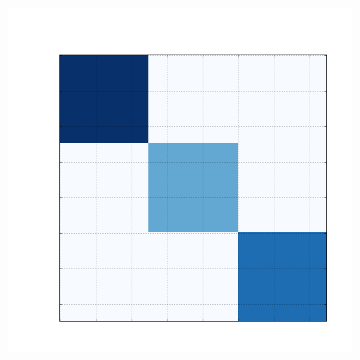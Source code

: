 \documentclass[10pt]{beamer}
\begin{document}
\begin{frame}
\begin{figure}[H]
\begin{subfigure}[b]{0.13\textwidth}
      \end{subfigure}
      \begin{subfigure}[b]{0.13\textwidth}
          \includegraphics[width=\textwidth]{img/b-reconstruction-binovnmtf.png}
      \end{subfigure}


\end{figure}
\end{frame}
\end{document}
